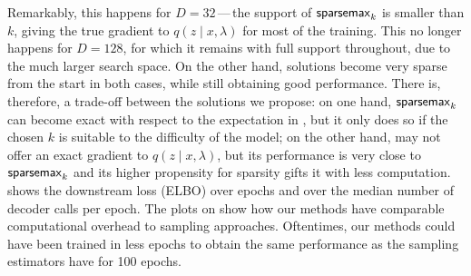 Remarkably, this happens for $D=32$\,---\,the support of
$\operatorname{\mathsf{sparsemax}_\text{$k$}}$ is smaller than $k$, giving the true gradient to
$q(z\mid x, \lambda)$ for most of the training. This no longer
happens for $D=128$, for which it remains with full support
throughout, due to the much larger search space. On the other hand,
\smap solutions become very sparse from the start in both cases,
while still obtaining good performance. There is, therefore, a
trade-off between the solutions we propose: on one hand,
$\operatorname{\mathsf{sparsemax}_\text{$k$}}$ can become exact with respect to the expectation in
, but it only does so if the chosen $k$ is suitable to
the difficulty of the model; on the other hand, \smap may not offer
an exact gradient to $q(z\mid x, \lambda)$, but its performance is
very close to $\operatorname{\mathsf{sparsemax}_\text{$k$}}$ and its higher propensity for sparsity
gifts it with less computation.  shows the
downstream loss (ELBO) over epochs and over the median number of
decoder calls per epoch. The plots on 
show how our methods have comparable computational overhead to
sampling approaches. Oftentimes, our methods could have been trained
in less epochs to obtain the same performance as the sampling
estimators have for 100 epochs.

